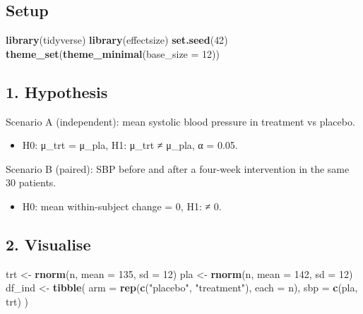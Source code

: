\documentclass[
]{article}
\newenvironment{Shaded}{\begin{snugshade}}{\end{snugshade}}
\newcommand{\AttributeTok}[1]{\textcolor[rgb]{0.13,0.29,0.53}{#1}}
\newcommand{\DecValTok}[1]{\textcolor[rgb]{0.00,0.00,0.81}{#1}}
\newcommand{\FunctionTok}[1]{\textcolor[rgb]{0.13,0.29,0.53}{\textbf{#1}}}
\newcommand{\NormalTok}[1]{#1}
\newcommand{\OtherTok}[1]{\textcolor[rgb]{0.56,0.35,0.01}{#1}}
\newcommand{\StringTok}[1]{\textcolor[rgb]{0.31,0.60,0.02}{#1}}
\providecommand{\tightlist}{%
  \setlength{\itemsep}{0pt}\setlength{\parskip}{0pt}}
\begin{document}
\subsection{Setup}\label{setup}

\begin{Shaded}
\begin{Highlighting}[]
\FunctionTok{library}\NormalTok{(tidyverse)}
\FunctionTok{library}\NormalTok{(effectsize)}
\FunctionTok{set.seed}\NormalTok{(}\DecValTok{42}\NormalTok{)}
\FunctionTok{theme\_set}\NormalTok{(}\FunctionTok{theme\_minimal}\NormalTok{(}\AttributeTok{base\_size =} \DecValTok{12}\NormalTok{))}
\end{Highlighting}
\end{Shaded}

\subsection{1. Hypothesis}\label{hypothesis}

Scenario A (independent): mean systolic blood pressure in treatment vs
placebo.

\begin{itemize}
\tightlist
\item
  H0: μ\_trt = μ\_pla, H1: μ\_trt ≠ μ\_pla, α = 0.05.
\end{itemize}

Scenario B (paired): SBP before and after a four-week intervention in
the same 30 patients.

\begin{itemize}
\tightlist
\item
  H0: mean within-subject change = 0, H1: ≠ 0.
\end{itemize}

\subsection{2. Visualise}\label{visualise}

\begin{Shaded}
\begin{Highlighting}[]
\NormalTok{trt }\OtherTok{\textless{}{-}} \FunctionTok{rnorm}\NormalTok{(n, }\AttributeTok{mean =} \DecValTok{135}\NormalTok{, }\AttributeTok{sd =} \DecValTok{12}\NormalTok{)}
\NormalTok{pla }\OtherTok{\textless{}{-}} \FunctionTok{rnorm}\NormalTok{(n, }\AttributeTok{mean =} \DecValTok{142}\NormalTok{, }\AttributeTok{sd =} \DecValTok{12}\NormalTok{)}
\NormalTok{df\_ind }\OtherTok{\textless{}{-}} \FunctionTok{tibble}\NormalTok{(}
  \AttributeTok{arm =} \FunctionTok{rep}\NormalTok{(}\FunctionTok{c}\NormalTok{(}\StringTok{"placebo"}\NormalTok{, }\StringTok{"treatment"}\NormalTok{), }\AttributeTok{each =}\NormalTok{ n),}
  \AttributeTok{sbp =} \FunctionTok{c}\NormalTok{(pla, trt)}
\NormalTok{)}
\end{Highlighting}
\end{Shaded}
\end{document}
